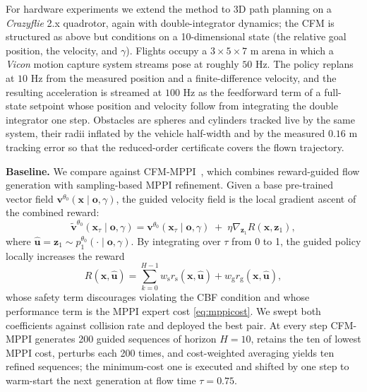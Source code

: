 \documentclass[letterpaper, 10 pt, conference]{ieeeconf}
\begin{document}
{\color{blue}
For hardware experiments we extend the method to 3D path planning on a \textit{Crazyflie} 2.x quadrotor, again with double-integrator dynamics; the CFM is structured as above but conditions on a 10-dimensional state (the relative goal position, the velocity, and $\gamma$). Flights occupy a $3\times5\times7$ m arena in which a \textit{Vicon} motion capture system streams pose at roughly $50$ Hz. The policy replans at $10$ Hz from the measured position and a finite-difference velocity, and the resulting acceleration is streamed at $100$ Hz as the feedforward term of a full-state setpoint whose position and velocity follow from integrating the double integrator one step. Obstacles are spheres and cylinders tracked live by the same system, their radii inflated by the vehicle half-width and by the measured $0.16$ m tracking error so that the reduced-order certificate covers the flown trajectory.
}

{\color{blue}\noindent \textbf{Baseline.}} We compare against CFM-MPPI~\cite{mizuta2025unified}, which combines reward-guided flow generation with sampling-based MPPI refinement. Given a base pre-trained vector field $\mathbf{v}^{\theta_{\text{0}}}(\mathbf{x}\!\mid\! \mathbf{o},\gamma)$, the guided velocity field is the local gradient ascent of the combined reward:
\begin{equation}
   \tilde{\mathbf{v}}^{\theta_{\text{0}}}(\mathbf{x}_\tau\!\mid\! \mathbf{o},\gamma)  = \mathbf{v}^{\theta_{\text{0}}}(\mathbf{x}_\tau\!\mid\! \mathbf{o},\gamma) \;+\; \eta \nabla_{\mathbf{z}_1}R(\mathbf{x},\mathbf{z}_1),
\end{equation}
where $\mathbf{\hat u} =\mathbf{z}_1 \sim p_1^{\theta_{\mathrm{0}}}(\cdot\mid\mathbf
o,\gamma)$. By integrating over $\tau$ from 0 to 1, the guided policy locally increases the reward
\begin{equation}
    R(\mathbf{x},\mathbf{\hat u}) = \sum_{k=0}^{H-1} w_\text{s} r_\text{s}(\mathbf{x},\mathbf{\hat u}) + w_\text{g} r_\text{g} (\mathbf{x},\mathbf{\hat u}),
\end{equation}
whose safety term discourages violating the CBF condition and whose performance term is the MPPI expert cost \eqref{eq:mppicost}. We swept both coefficients against collision rate and deployed the best pair. At every step CFM-MPPI generates 200 guided sequences of horizon $H=10$, retains the ten of lowest MPPI cost, perturbs each 200 times, and cost-weighted averaging yields ten refined sequences; the minimum-cost one is executed and shifted by one step to warm-start the next generation at flow time $\tau = 0.75$.
\end{document}
